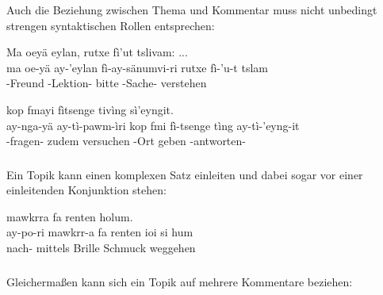 \noindent Auch die Beziehung zwischen Thema und Kommentar muss nicht unbedingt strengen syntaktischen Rollen entsprechen:

\begin{interlin}
	\glll \Npawl{}Ma oeyä eylan,  rutxe fì’ut tslivam: ... \\
	ma oe-yä ay-'eylan fì-ay-sänumvi-ri rutxe fì-'u-t tslam \\
	  -Freund -Lektion- bitte -Sache- verstehen \\
\end{interlin}

\begin{interlin}
	\glll \Npawl{}  kop fmayi fìtsenge tivìng sì'eyngit. \\
	ay-nga-yä ay-tì-pawm-ìri kop fmi fì-tsenge tìng ay-tì-'eyng-it \\
	 -fragen- zudem versuchen -Ort geben -antworten- \\
	\end{interlin}

\subsubsection{} Ein Topik kann einen komplexen Satz einleiten und dabei sogar vor einer einleitenden Konjunktion stehen:

\begin{interlin}
	\glll \Npawl{} mawkrra fa renten   holum. \\
	ay-po-ri mawkrr-a fa renten ioi si hum \\
	 nach- mittels Brille Schmuck  weggehen \\
\end{interlin}

\subsubsection{} Gleichermaßen kann sich ein Topik auf mehrere Kommentare beziehen: 

